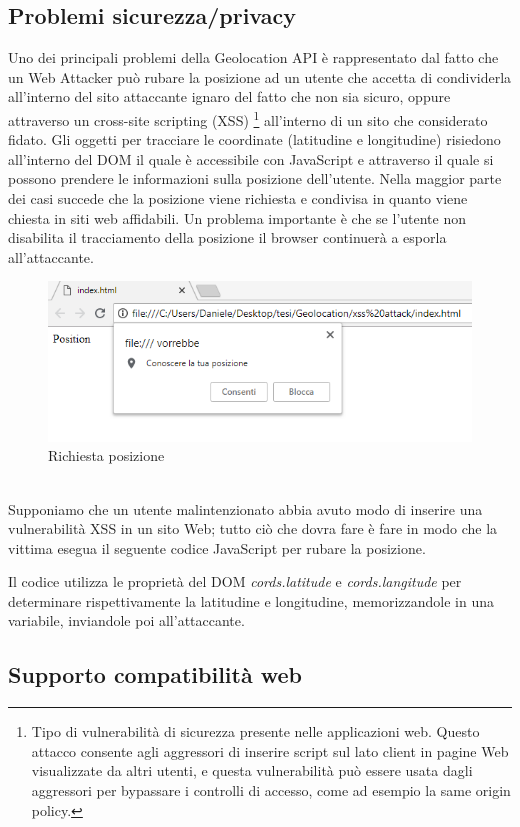 \documentclass[11pt ,a4paper , twoside , openright ]{article}
\begin{document}
\subsection{Problemi sicurezza/privacy} 
Uno dei principali problemi della Geolocation API \cite{rif6} \cite{rif7} è rappresentato dal fatto che un Web Attacker può rubare la posizione ad un utente che accetta di condividerla all'interno del sito attaccante ignaro del fatto che non sia sicuro, oppure attraverso un cross-site scripting (XSS) \footnote{Tipo di vulnerabilità di sicurezza presente nelle applicazioni web. Questo attacco consente agli aggressori di inserire script sul lato client in pagine Web visualizzate da altri utenti, e questa vulnerabilità può essere usata dagli aggressori per bypassare i controlli di accesso, come ad esempio la same origin policy.} all'interno di un sito che considerato fidato. Gli oggetti per tracciare le coordinate (latitudine e longitudine) risiedono all'interno del DOM il quale è accessibile con JavaScript e attraverso il quale si possono prendere le informazioni sulla posizione dell'utente. 
Nella maggior parte dei casi succede che la posizione viene richiesta e condivisa in quanto viene chiesta in siti web affidabili.
Un problema importante è che se l'utente non disabilita il tracciamento della posizione il browser continuerà a esporla all'attaccante.
\begin{figure}[h]
	\centering
	\includegraphics[width=0.5\linewidth]{pos1}
	\caption{Richiesta posizione}
	\label{fig: Richiesta posizione}
\end{figure}
\pagebreak
\\
Supponiamo che un utente malintenzionato abbia avuto modo di inserire una vulnerabilità XSS in un sito Web; tutto ciò che dovra fare è fare in modo che la vittima esegua il seguente codice JavaScript per rubare la posizione.

Il codice utilizza le proprietà del DOM \textit{cords.latitude} e \textit{cords.langitude} per determinare rispettivamente la latitudine e longitudine, memorizzandole in una variabile, inviandole poi all'attaccante. 
\\
\subsection{Supporto compatibilità web}
\end{document}

